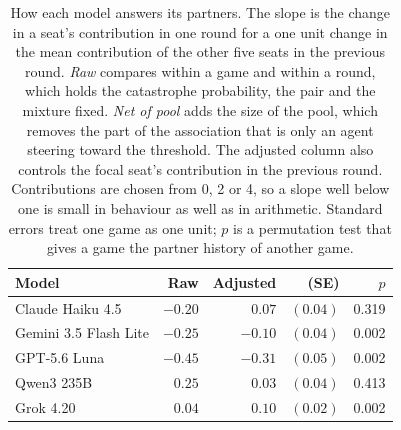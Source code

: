 \begin{table}[t]
\centering
\small
\setlength{\tabcolsep}{2.5pt}%
\caption{How each model answers its partners. The slope is the change in a seat's contribution in one round for a one unit change in the mean contribution of the other five seats in the previous round. \emph{Raw} compares within a game and within a round, which holds the catastrophe probability, the pair and the mixture fixed. \emph{Net of pool} adds the size of the pool, which removes the part of the association that is only an agent steering toward the threshold. The adjusted column also controls the focal seat's contribution in the previous round. Contributions are chosen from 0, 2 or 4, so a slope well below one is small in behaviour as well as in arithmetic. Standard errors treat one game as one unit; $p$ is a permutation test that gives a game the partner history of another game.}
\label{tab:mixed-recip}
\begin{tabular}{lrrrr}
\toprule
Model & Raw & Adjusted & (SE) & $p$ \\
\midrule
Claude Haiku 4.5 & $-0.20$ & $0.07$ & $(0.04)$ & 0.319 \\
Gemini 3.5 Flash Lite & $-0.25$ & $-0.10$ & $(0.04)$ & 0.002 \\
GPT-5.6 Luna & $-0.45$ & $-0.31$ & $(0.05)$ & 0.002 \\
Qwen3 235B & $0.25$ & $0.03$ & $(0.04)$ & 0.413 \\
Grok 4.20 & $0.04$ & $0.10$ & $(0.02)$ & 0.002 \\
\bottomrule
\end{tabular}
\end{table}
